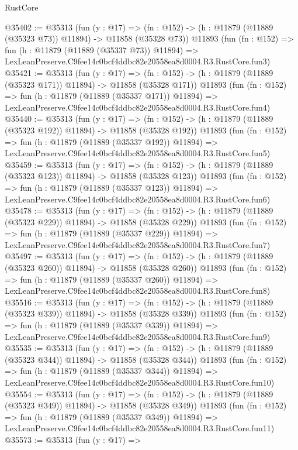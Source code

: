 \begin{lexlean}{RustCore}
\begin{coremodule}
@35402 := @35313
    (fun (y : @17) =>
    (fn : @152) -> (h : @11879 (@11889 (@35323 @73)) @11894) -> @11858 (@35328 @73))
    @11893
    (fun (fn : @152) =>
    fun (h : @11879 (@11889 (@35337 @73)) @11894) =>
    LexLeanPreserve.C9fee14c0bcf4ddbc82e20558ea8d0004.R3.RustCore.fun3)
@35421 := @35313
    (fun (y : @17) =>
    (fn : @152) -> (h : @11879 (@11889 (@35323 @171)) @11894) -> @11858 (@35328 @171))
    @11893
    (fun (fn : @152) =>
    fun (h : @11879 (@11889 (@35337 @171)) @11894) =>
    LexLeanPreserve.C9fee14c0bcf4ddbc82e20558ea8d0004.R3.RustCore.fun4)
@35440 := @35313
    (fun (y : @17) =>
    (fn : @152) -> (h : @11879 (@11889 (@35323 @192)) @11894) -> @11858 (@35328 @192))
    @11893
    (fun (fn : @152) =>
    fun (h : @11879 (@11889 (@35337 @192)) @11894) =>
    LexLeanPreserve.C9fee14c0bcf4ddbc82e20558ea8d0004.R3.RustCore.fun5)
@35459 := @35313
    (fun (y : @17) =>
    (fn : @152) -> (h : @11879 (@11889 (@35323 @123)) @11894) -> @11858 (@35328 @123))
    @11893
    (fun (fn : @152) =>
    fun (h : @11879 (@11889 (@35337 @123)) @11894) =>
    LexLeanPreserve.C9fee14c0bcf4ddbc82e20558ea8d0004.R3.RustCore.fun6)
@35478 := @35313
    (fun (y : @17) =>
    (fn : @152) -> (h : @11879 (@11889 (@35323 @229)) @11894) -> @11858 (@35328 @229))
    @11893
    (fun (fn : @152) =>
    fun (h : @11879 (@11889 (@35337 @229)) @11894) =>
    LexLeanPreserve.C9fee14c0bcf4ddbc82e20558ea8d0004.R3.RustCore.fun7)
@35497 := @35313
    (fun (y : @17) =>
    (fn : @152) -> (h : @11879 (@11889 (@35323 @260)) @11894) -> @11858 (@35328 @260))
    @11893
    (fun (fn : @152) =>
    fun (h : @11879 (@11889 (@35337 @260)) @11894) =>
    LexLeanPreserve.C9fee14c0bcf4ddbc82e20558ea8d0004.R3.RustCore.fun8)
@35516 := @35313
    (fun (y : @17) =>
    (fn : @152) -> (h : @11879 (@11889 (@35323 @339)) @11894) -> @11858 (@35328 @339))
    @11893
    (fun (fn : @152) =>
    fun (h : @11879 (@11889 (@35337 @339)) @11894) =>
    LexLeanPreserve.C9fee14c0bcf4ddbc82e20558ea8d0004.R3.RustCore.fun9)
@35535 := @35313
    (fun (y : @17) =>
    (fn : @152) -> (h : @11879 (@11889 (@35323 @344)) @11894) -> @11858 (@35328 @344))
    @11893
    (fun (fn : @152) =>
    fun (h : @11879 (@11889 (@35337 @344)) @11894) =>
    LexLeanPreserve.C9fee14c0bcf4ddbc82e20558ea8d0004.R3.RustCore.fun10)
@35554 := @35313
    (fun (y : @17) =>
    (fn : @152) -> (h : @11879 (@11889 (@35323 @349)) @11894) -> @11858 (@35328 @349))
    @11893
    (fun (fn : @152) =>
    fun (h : @11879 (@11889 (@35337 @349)) @11894) =>
    LexLeanPreserve.C9fee14c0bcf4ddbc82e20558ea8d0004.R3.RustCore.fun11)
@35573 := @35313
    (fun (y : @17) =>

\end{coremodule}
\end{lexlean}
